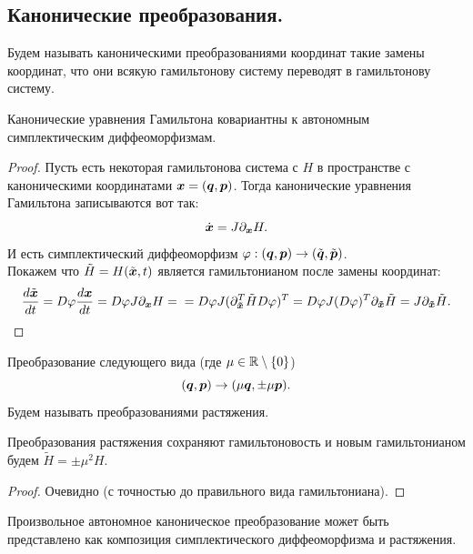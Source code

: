 \subsection{Канонические преобразования.}
\begin{definition}
    Будем называть каноническими преобразованиями координат такие замены координат, что они всякую гамильтонову систему переводят в гамильтонову систему.
\end{definition}
\begin{theorem}
    Канонические уравнения Гамильтона ковариантны к автономным симплектическим диффеоморфизмам.
\end{theorem}
\begin{proof}
    Пусть есть некоторая гамильтонова система с $H$ в пространстве с каноническими координатами $\boldsymbol{x} = (\boldsymbol{q}, \boldsymbol{p})$.
    Тогда канонические уравнения Гамильтона записываются вот так:
    \[
        \dot{\boldsymbol{x}} = J\partial_{\boldsymbol{x}} H.
    \]
    И есть симплектический диффеоморфизм $\varphi: (\boldsymbol{q}, \boldsymbol{p}) \to (\tilde{\boldsymbol{q}}, \tilde{\boldsymbol{p}})$. \\
    Покажем что $\tilde{H} = H(\tilde{\boldsymbol{x}}, t)$ является гамильтонианом после замены координат:
    \begin{equation*}
        \dfrac{d \tilde{\boldsymbol{x}}}{dt} = D\varphi \dfrac{d \boldsymbol{x}}{dt} = D\varphi J \partial_{\boldsymbol{x}} H = \\ = D\varphi J (\partial_{\boldsymbol{\tilde{x}}}^T \tilde{H} D\varphi)^T = D\varphi J (D\varphi)^T \partial_{\boldsymbol{\tilde{x}}} \tilde{H} = J \partial_{\boldsymbol{\tilde{x}}} \tilde{H}.
    \end{equation*}
\end{proof}
\begin{definition}
    Преобразование следующего вида (где $\mu \in \mathbb{R} \setminus \{0\}$)
    \[
        (\boldsymbol{q}, \boldsymbol{p}) \to (\mu \boldsymbol{q}, \pm \mu \boldsymbol{p}).
    \]
    Будем называть преобразованиями растяжения.
\end{definition}
\begin{lemma}
    Преобразования растяжения сохраняют гамильтоновость и новым гамильтонианом будем $\tilde{H} = \pm \mu^2 H$.
\end{lemma}
\begin{proof}
    Очевидно (с точностью до правильного вида гамильтониана).
\end{proof}
\begin{theorem}
    Произвольное автономное каноническое преобразование может быть представлено как композиция симплектического диффеоморфизма и растяжения.
\end{theorem}
